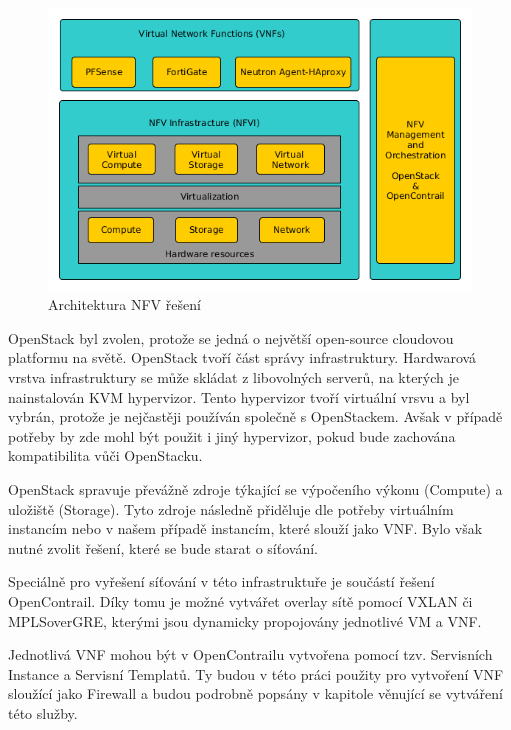 \begin{figure}[h]
\begin{centering}
\includegraphics[scale=0.51]{images/VNF_overview}
\par\end{centering}
\caption{Architektura NFV řešení\label{fig:VNF_overview}}
\end{figure}

OpenStack byl zvolen, protože se jedná o největší open-source cloudovou platformu na světě. OpenStack tvoří část správy infrastruktury. Hardwarová vrstva infrastruktury se může skládat z libovolných serverů, na kterých je nainstalován KVM hypervizor. Tento hypervizor tvoří virtuální vrsvu a byl vybrán, protože je nejčastěji používán společně s OpenStackem. Avšak v případě potřeby by zde mohl být použit i jiný hypervizor, pokud bude zachována kompatibilita vůči OpenStacku.

OpenStack spravuje převážně zdroje týkající se výpočeního výkonu (Compute) a uložiště (Storage). Tyto zdroje následně přiděluje dle potřeby virtuálním instancím nebo v našem případě instancím, které slouží jako VNF. Bylo však nutné zvolit řešení, které se bude starat o síťování.

Speciálně pro vyřešení síťování v této infrastruktuře je součástí řešení OpenContrail. Díky tomu je možné vytvářet overlay sítě pomocí VXLAN či MPLSoverGRE, kterými jsou dynamicky propojovány jednotlivé VM a VNF. 

Jednotlivá VNF mohou být v OpenContrailu vytvořena pomocí tzv. Servisních Instance a Servisní Templatů. Ty budou v této práci použity pro vytvoření VNF sloužící jako Firewall a budou podrobně popsány v kapitole věnující se vytváření této služby.

